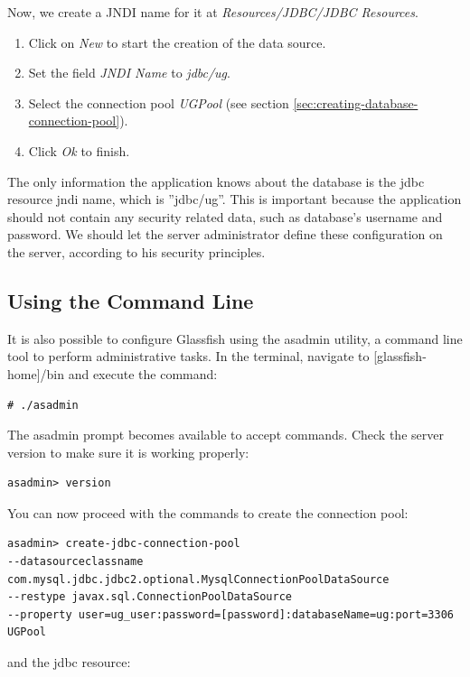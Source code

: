 \documentclass[envcountsame,envcountchap]{svmono}
\begin{document}
Now, we create a JNDI name for it at \textit{Resources/JDBC/JDBC Resources}.

\begin{enumerate}
\item Click on \textit{New} to start the creation of the data source.
\item Set the field \textit{JNDI Name} to \textit{jdbc/ug}.
\item Select the connection pool \textit{UGPool} (see section \ref{sec:creating-database-connection-pool}).
\item Click \textit{Ok} to finish.
\end{enumerate}

The only information the application knows about the database is the jdbc resource jndi name, which is ''jdbc/ug''. This is important because the application should not contain any security related data, such as database's username and password. We should let the server administrator define these configuration on the server, according to his security principles.

\subsection{Using the Command Line}

It is also possible to configure Glassfish using the asadmin utility, a command line tool to perform administrative tasks. In the terminal, navigate to [glassfish-home]/bin and execute the command:

\begin{verbatim}
# ./asadmin
\end{verbatim}

The asadmin prompt becomes available to accept commands. Check the server version to make sure it is working properly:

\begin{verbatim}
asadmin> version
\end{verbatim}

You can now proceed with the commands to create the connection pool:

\begin{verbatim}
asadmin> create-jdbc-connection-pool 
--datasourceclassname com.mysql.jdbc.jdbc2.optional.MysqlConnectionPoolDataSource 
--restype javax.sql.ConnectionPoolDataSource
--property user=ug_user:password=[password]:databaseName=ug:port=3306 UGPool
\end{verbatim}

and the jdbc resource:
\end{document}
